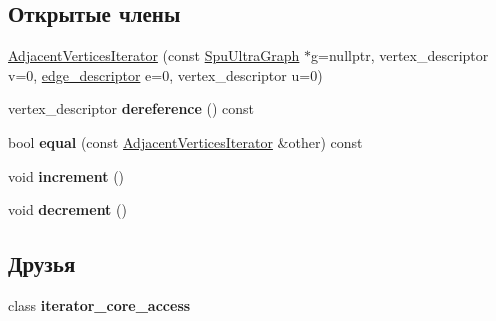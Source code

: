 \subsection*{Открытые члены}
\begin{DoxyCompactItemize}
\item 
\hyperlink{class_s_p_u___g_r_a_p_h_1_1_spu_ultra_graph_1_1_adjacent_vertices_iterator_a925cadcc4cf9412ffad955f052bbfe85}{Adjacent\+Vertices\+Iterator} (const \hyperlink{class_s_p_u___g_r_a_p_h_1_1_spu_ultra_graph}{Spu\+Ultra\+Graph} $\ast$g=nullptr, vertex\+\_\+descriptor v=0, \hyperlink{class_s_p_u___g_r_a_p_h_1_1_spu_ultra_graph_a5f3776e003ef0a1648f1d9f84289810b}{edge\+\_\+descriptor} e=0, vertex\+\_\+descriptor u=0)
\item 
\mbox{\label{class_s_p_u___g_r_a_p_h_1_1_spu_ultra_graph_1_1_adjacent_vertices_iterator_a392deba0b5335898f49347e119b34b44}} 
vertex\+\_\+descriptor {\bfseries dereference} () const
\item 
\mbox{\label{class_s_p_u___g_r_a_p_h_1_1_spu_ultra_graph_1_1_adjacent_vertices_iterator_ad8ce4cef0876df909845be2b4f284f9e}} 
bool {\bfseries equal} (const \hyperlink{class_s_p_u___g_r_a_p_h_1_1_spu_ultra_graph_1_1_adjacent_vertices_iterator}{Adjacent\+Vertices\+Iterator} \&other) const
\item 
\mbox{\label{class_s_p_u___g_r_a_p_h_1_1_spu_ultra_graph_1_1_adjacent_vertices_iterator_a568b6ac3fa6cda300c434d8772508387}} 
void {\bfseries increment} ()
\item 
\mbox{\label{class_s_p_u___g_r_a_p_h_1_1_spu_ultra_graph_1_1_adjacent_vertices_iterator_ab4879ad89bd0493e7d836f5dc715619b}} 
void {\bfseries decrement} ()
\end{DoxyCompactItemize}
\subsection*{Друзья}
\begin{DoxyCompactItemize}
\item 
\mbox{\label{class_s_p_u___g_r_a_p_h_1_1_spu_ultra_graph_1_1_adjacent_vertices_iterator_a0975271623c74c5b89bdf8d7fbce69c4}} 
class {\bfseries iterator\+\_\+core\+\_\+access}
\end{DoxyCompactItemize}


